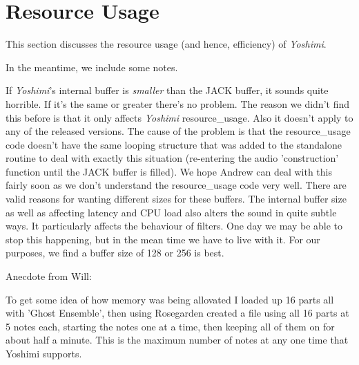 %
%
%

\section{Resource Usage}
\label{sec:resource_usage}

   This section discusses the resource usage (and hence, efficiency) of
   \textsl{Yoshimi}.

   In the meantime, we include some notes.

   If \textsl{Yoshimi}'s internal buffer is \textsl{smaller} than the JACK
   buffer, it sounds quite horrible. If it's the same or greater there's no
   problem. The reason we didn't find this before is that it only affects
   \textsl{Yoshimi} resource_usage.  Also it doesn't apply to any of the
   released versions.  The cause of the problem is that the resource_usage code
   doesn't have the same looping structure that was added to the standalone
   routine to deal with exactly this situation (re-entering the audio
   'construction' function until the JACK buffer is filled). We hope Andrew can
   deal with this fairly soon as we don't understand the resource_usage code
   very well.  There are valid reasons for wanting different sizes for these
   buffers. The internal buffer size as well as affecting latency and CPU load
   also alters the sound in quite subtle ways. It particularly affects the
   behaviour of filters.  One day we may be able to stop this happening, but in
   the mean time we have to live with it.  For our purposes, we find a buffer
   size of 128 or 256 is best.

   Anecdote from Will:

   To get some idea of how memory was being allovated I loaded up 16 parts all
   with 'Ghost Ensemble', then using Rosegarden created a file using all 16
   parts at 5 notes each, starting the notes one at a time, then keeping all of
   them on for about half a minute. This is the maximum number of notes at any
   one time that Yoshimi supports.

